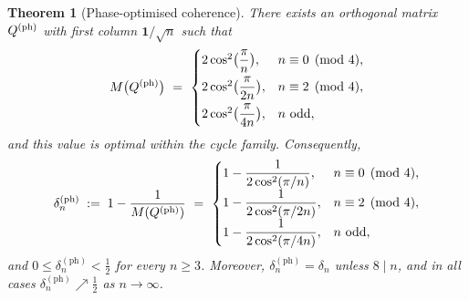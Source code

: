\documentclass[12pt,fleqn]{amsart}
\renewcommand{\le}{\leqslant}
\renewcommand{\ge}{\geqslant}
\newtheorem{thm}{Theorem}
\theoremstyle{definition}
\theoremstyle{remark}
\newcommand{\1}{\mathbf{1}}
\begin{document}
\begin{thm}[Phase-optimised coherence]\label{thm:phase-correct}
There exists an orthogonal matrix $Q^{\rm (ph)}$ with first column $\1/\sqrt n$ such that
\[
M\big(Q^{\rm (ph)}\big)\ =\
\begin{cases}
2\cos^2\!\big(\dfrac{\pi}{n}\big),   & n\equiv 0\pmod{4},\\[2mm]
2\cos^2\!\big(\dfrac{\pi}{2n}\big),  & n\equiv 2\pmod{4},\\[2mm]
2\cos^2\!\big(\dfrac{\pi}{4n}\big),  & n\ \mathrm{odd},
\end{cases}
\]
and this value is optimal within the cycle family.
Consequently,
\[
\delta^{\mathrm{(ph)}}_n \;:=\;
1-\frac{1}{ M(Q^{\rm (ph)})}
\ =\
\begin{cases}
\displaystyle 1-\dfrac{1}{2\cos^2(\pi/n)},   & n\equiv 0\pmod{4},\\[2mm]
\displaystyle 1-\dfrac{1}{2\cos^2(\pi/2n)},  & n\equiv 2\pmod{4},\\[2mm]
\displaystyle 1-\dfrac{1}{2\cos^2(\pi/4n)},  & n\ \text{odd},
\end{cases}
\]
and $0\le \delta^{\mathrm{(ph)}}_n<\tfrac12$ for every $n\ge 3$. Moreover, $\delta^{\mathrm{(ph)}}_n=\delta_n$ unless $8\mid n$, and in all cases $\delta^{\mathrm{(ph)}}_n \nearrow \tfrac12$ as $n\to\infty$.
\end{thm}
\end{document}
